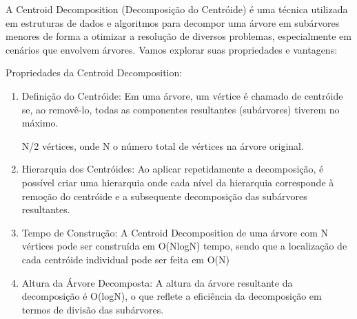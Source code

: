 A Centroid Decomposition (Decomposição do Centróide) é uma técnica utilizada em estruturas de dados e algoritmos para decompor uma árvore em subárvores menores de forma a otimizar a resolução de diversos problemas, especialmente em cenários que envolvem árvores. Vamos explorar suas propriedades e vantagens:

Propriedades da Centroid Decomposition:
\begin{enumerate}
    \item Definição do Centróide: Em uma árvore, um vértice é chamado de centróide se, ao removê-lo, todas as componentes resultantes (subárvores) tiverem no máximo.
    
    N/2 vértices, onde N o número total de vértices na árvore original.
    \item Hierarquia dos Centróides: Ao aplicar repetidamente a decomposição, é possível criar uma hierarquia onde cada nível da hierarquia corresponde à remoção do centróide e a subsequente decomposição das subárvores resultantes.
    \item Tempo de Construção: A Centroid Decomposition de uma árvore com N vértices pode ser construída em O(NlogN) tempo, sendo que a localização de cada centróide individual pode ser feita em O(N)
    \item Altura da Árvore Decomposta: A altura da árvore resultante da decomposição é O(logN), o que reflete a eficiência da decomposição em termos de divisão das subárvores.
\end{enumerate}

